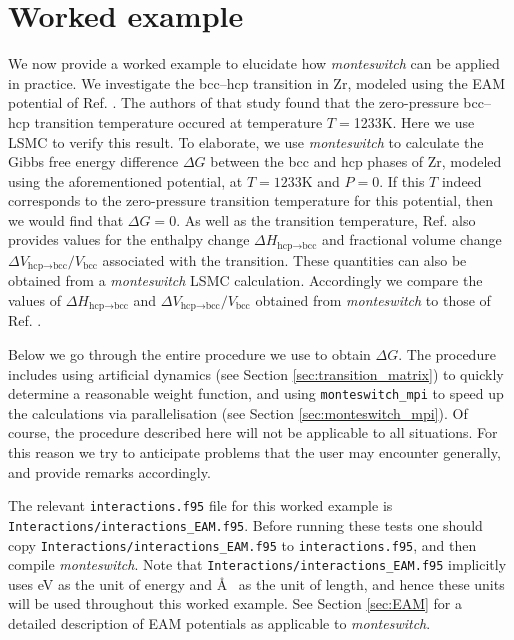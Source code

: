 \documentclass{report}
\begin{document}
\chapter{Worked example}\label{chapter:example}
We now provide a worked example to elucidate how \emph{monteswitch} can be applied in practice. We investigate the bcc--hcp
transition in Zr, modeled using the EAM potential of Ref. \cite{Mendelev_2007}. The authors of that study found that the zero-pressure bcc--hcp
transition temperature occured at temperature $T=$1233K. Here we use LSMC to verify this result. To elaborate, we
use \emph{monteswitch} to calculate the Gibbs free energy difference $\Delta G$ between the bcc and hcp phases of Zr, modeled using 
the aforementioned potential, at $T=1233$K and $P=0$. If this $T$ indeed corresponds to the zero-pressure transition temperature for this potential,
then we would find that $\Delta G=0$. As well as the transition temperature, Ref. \cite{Mendelev_2007} also provides values for the enthalpy change 
$\Delta H_{\text{hcp$\to$bcc}}$ and fractional volume change $\Delta V_{\text{hcp$\to$bcc}}/V_{\text{bcc}}$ associated with the transition. These 
quantities can also be obtained from a \emph{monteswitch} LSMC calculation. Accordingly we compare the values of $\Delta H_{\text{hcp$\to$bcc}}$ and
$\Delta V_{\text{hcp$\to$bcc}}/V_{\text{bcc}}$ obtained from \emph{monteswitch} to those of Ref. \cite{Mendelev_2007}.

Below we go through the entire procedure we use to obtain $\Delta G$. The procedure includes using artificial dynamics (see Section 
\ref{sec:transition_matrix}) to quickly determine a reasonable weight function, and using \texttt{monteswitch\_mpi} to speed up the calculations
via parallelisation (see Section \ref{sec:monteswitch_mpi}). Of course, the procedure described here will not be applicable to all situations. 
For this reason we try to anticipate problems that the user may encounter generally, and provide remarks accordingly.

The relevant \texttt{interactions.f95} file for this worked example is \texttt{Interactions/interactions\_EAM.f95}.
Before running these tests one should copy \texttt{Interactions/interactions\_EAM.f95} to \texttt{interactions.f95}, and then compile 
\emph{monteswitch}. Note that \texttt{Interactions/interactions\_EAM.f95} implicitly uses eV as the unit of energy and \AA~ as the unit
of length, and hence these units will be used throughout this worked example. See Section \ref{sec:EAM} for a detailed description of
EAM potentials as applicable to \emph{monteswitch}.
\end{document}
